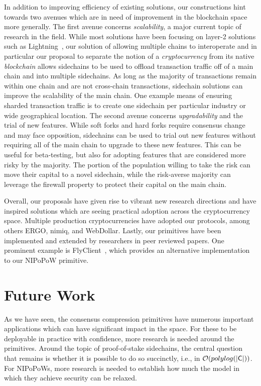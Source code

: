 In addition to improving efficiency of existing solutions, our constructions
hint towards two avenues which are in need of improvement in the blockchain
space more generally. The first avenue concerns \emph{scalability}, a major
current topic of research in the field. While most solutions have been focusing
on layer-2 solutions such as Lightning~\cite{lightning}, our solution of
allowing multiple chains to interoperate and in particular our proposal to
separate the notion of a \emph{cryptocurrency} from its native \emph{blockchain}
allows sidechains to be used to offload transaction traffic off of a main chain
and into multiple sidechains. As long as the majority of transactions remain
within one chain and are not cross-chain transactions, sidechain solutions can
improve the scalability of the main chain. One example means of ensuring sharded
transaction traffic is to create one sidechain per particular industry or
wide geographical location. The second avenue concerns \emph{upgradability} and
the trial of new features. While soft forks and hard forks require consensus
change and may face opposition, sidechains can be used to trial out new features
without requiring all of the main chain to upgrade to these new features. This
can be useful for beta-testing, but also for adopting features that are
considered more risky by the majority. The portion of the population willing to
take the risk can move their capital to a novel sidechain, while the risk-averse
majority can leverage the firewall property to protect their capital on the main
chain.

Overall, our proposals have given rise to vibrant new research directions and
have inspired solutions which are seeing practical adoption across the
cryptocurrency space. Multiple production cryptocurrencies have adopted our
protocols, among others ERGO, nimiq, and WebDollar. Lastly, our primitives have
been implemented and extended by researchers in peer reviewed papers. One
prominent example is FlyClient~\cite{flyclient}, which provides an alternative
implementation to our NIPoPoW primitive.

\section{Future Work}

As we have seen, the consensus compression primitives have numerous important
applications which can have significant impact in the space. For these to be
deployable in practice with confidence, more research is needed around the
primitives. Around the topic of proof-of-stake sidechains, the central question
that remains is whether it is possible to do so succinctly, i.e., in
$\mathcal{O}(polylog(|\mathsf{C}|))$. For NIPoPoWs, more research is needed to establish
how much the model in which they achieve security can be relaxed.

